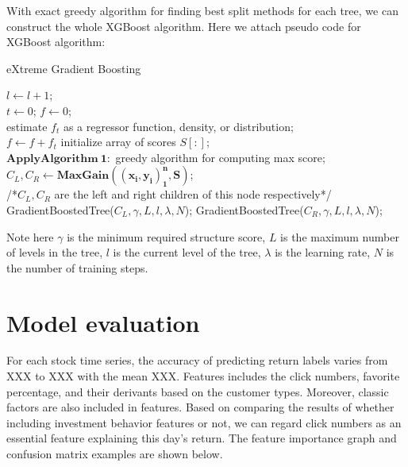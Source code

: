 \documentclass[letterpaper]{article}
\begin{document}
With exact greedy algorithm for finding best split methods for each tree, we can construct the whole XGBoost algorithm. Here we attach pseudo code for XGBoost algorithm:

\begin{algorithm}[H]
            \caption{eXtreme Gradient Boosting}
            $l \gets l + 1$;\\
            { 
            $t \gets 0$; $f \gets 0$;\\
                { 
                    estimate $f_t$ as a regressor function, density, or distribution;\\
                    $f \gets f + f_t$
                }
                initialize array of scores $S[:]$;\\
                $\bm{Apply Algorithm\ 1:}$ greedy algorithm for computing max score;\\
                $C_L, C_R \gets \bm{MaxGain\left((x_i, y_i)_1^n, S\right)}$;\\
                /*$C_L, C_R$ are the left and right children of this node respectively*/\\
                {
                GradientBoostedTree($C_L, \gamma, L, l, \lambda, N$);
                }
                {
                GradientBoostedTree($C_R, \gamma, L, l, \lambda, N$);
                }
            } 
\end{algorithm}

Note here $\gamma$ is the minimum required structure score, $L$ is the maximum number of levels in the tree, $l$ is the current level of the tree, $\lambda$ is the learning rate, $N$ is the number of training steps.

\section{Model evaluation}
\label{model_evaluation}

For each stock time series, the accuracy of predicting return labels varies from XXX to XXX with the mean XXX. Features includes the click numbers, favorite percentage, and their derivants based on the customer types. Moreover, classic factors are also included in features. Based on comparing the results of whether including investment behavior features or not, we can regard click numbers as an essential feature explaining this day’s return. The feature importance graph and confusion matrix examples are shown below.
\end{document}
